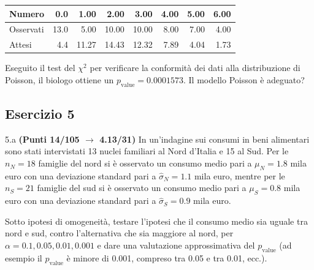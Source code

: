 \documentclass[
  11pt,
]{book}
\theoremstyle{mytheoremstyle}
\theoremstyle{mydefstyle}
\begin{document}
\begin{table}[H]
\centering
\begin{tabular}{l|r|r|r|r|r|r|r}
\hline
Numero & 0.0 & 1.00 & 2.00 & 3.00 & 4.00 & 5.00 & 6.00\\
\hline
Osservati & 13.0 & 5.00 & 10.00 & 10.00 & 8.00 & 7.00 & 4.00\\
\hline
Attesi & 4.4 & 11.27 & 14.43 & 12.32 & 7.89 & 4.04 & 1.73\\
\hline
\end{tabular}
\end{table}

Eseguito il test del \(\chi^2\) per verificare la conformità dei dati alla distribuzione di Poisson, il biologo ottiene un \(p_\text{value}=0.0001573\). Il modello Poisson è adeguato?

\subsection{Esercizio 5}\label{esercizio-5-37}

5.a \textbf{(Punti 14/105 \(\rightarrow\) 4.13/31)} In un'indagine sui consumi in beni alimentari sono stati intervistati 13 nuclei familiari al Nord d'Italia e 15 al Sud.
Per le \(n_N=18\) famiglie del nord si è osservato un consumo medio pari a \(\mu_N=1.8\) mila euro con una deviazione standard pari a \(\hat\sigma_N=1.1\) mila euro, mentre per le \(n_S=21\) famiglie del sud si è osservato un consumo medio pari a \(\mu_S=0.8\) mila euro con una deviazione standard pari a \(\hat\sigma_S=0.9\) mila euro.

Sotto ipotesi di omogeneità, testare l'ipotesi che il consumo medio sia uguale tra nord e sud, contro l'alternativa che sia maggiore al nord,
per \(\alpha=0.1,0.05,0.01,0.001\) e dare una valutazione approssimativa del \(p_\text{value}\) (ad esempio il \(p_\text{value}\) è minore di 0.001, compreso tra 0.05 e tra 0.01, ecc.).
\end{document}
